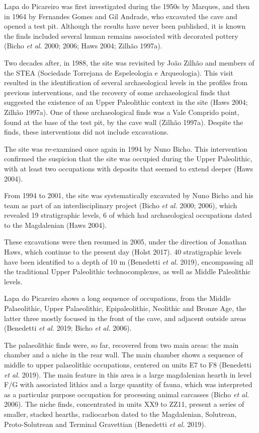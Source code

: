 \documentclass[12pt,twoside]{reedthesis}
\begin{document}
Lapa do Picareiro was first investigated during the 1950s by Marques, and then in 1964 by Fernandes Gomes and Gil Andrade, who excavated the cave and opened a test pit. Although the results have never been published, it is known the finds included several human remains associated with decorated pottery (Bicho \emph{et al.} 2000; 2006; Haws 2004; Zilhão 1997a).

Two decades after, in 1988, the site was revisited by João Zilhão and members of the STEA (Sociedade Torrejana de Espeleologia e Arqueologia). This visit resulted in the identification of several archaeological levels in the profiles from previous interventions, and the recovery of some archaeological finds that suggested the existence of an Upper Paleolithic context in the site (Haws 2004; Zilhão 1997a). One of these archaeological finds was a Vale Comprido point, found at the base of the test pit, by the cave wall (Zilhão 1997a). Despite the finds, these interventions did not include excavations.

The site was re-examined once again in 1994 by Nuno Bicho. This intervention confirmed the suspicion that the site was occupied during the Upper Paleolithic, with at least two occupations with deposits that seemed to extend deeper (Haws 2004).

From 1994 to 2001, the site was systematically excavated by Nuno Bicho and his team as part of an interdisciplinary project (Bicho \emph{et al.} 2000; 2006), which revealed 19 stratigraphic levels, 6 of which had archaeological occupations dated to the Magdalenian (Haws 2004).

These excavations were then resumed in 2005, under the direction of Jonathan Haws, which continue to the present day (Holst 2017). 40 stratigraphic levels have been identified to a depth of 10 m (Benedetti \emph{et al.} 2019), encompassing all the traditional Upper Paleolithic technocomplexes, as well as Middle Paleolithic levels.

Lapa do Picareiro shows a long sequence of occupations, from the Middle Palaeolithic, Upper Palaeolithic, Epipaleolithic, Neolithic and Bronze Age, the latter three mostly focused in the front of the cave, and adjacent outside areas (Benedetti \emph{et al.} 2019; Bicho \emph{et al.} 2006).

The palaeolithic finds were, so far, recovered from two main areas: the main chamber and a niche in the rear wall. The main chamber shows a sequence of middle to upper palaeolithic occupations, centered on units E7 to F8 (Benedetti \emph{et al.} 2019). The main feature in this area is a large magdalenian hearth in level F/G with associated lithics and a large quantity of fauna, which was interpreted as a particular purpose occupation for processing animal carcasses (Bicho \emph{et al.} 2006). The niche finds, concentrated in units XX9 to ZZ11, present a series of smaller, stacked hearths, radiocarbon dated to the Magdalenian, Solutrean, Proto-Solutrean and Terminal Gravettian (Benedetti \emph{et al.} 2019).
\end{document}
